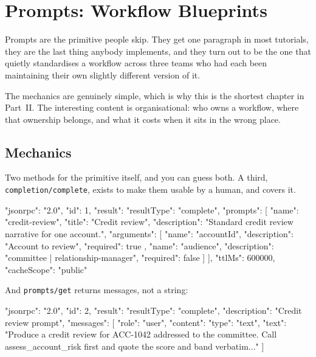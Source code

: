 \chapter{Prompts: Workflow Blueprints}
\label{ch:prompts}

Prompts are the primitive people skip. They get one paragraph in most tutorials,
they are the last thing anybody implements, and they turn out to be the one that
quietly standardises a workflow across three teams who had each been maintaining
their own slightly different version of it.

The mechanics are genuinely simple, which is why this is the shortest chapter in
Part~II. The interesting content is organisational: who owns a workflow, where
that ownership belongs, and what it costs when it sits in the wrong place.

\section{Mechanics}

Two methods for the primitive itself, and you can guess both. A third,
\texttt{completion/complete}, exists to make them usable by a human, and
 covers it.

\begin{wire}
{
  "jsonrpc": "2.0",
  "id": 1,
  "result": {
    "resultType": "complete",
    "prompts": [
      {
        "name": "credit-review",
        "title": "Credit review",
        "description": "Standard credit review narrative for one account.",
        "arguments": [
          { "name": "accountId", "description": "Account to review",
            "required": true },
          { "name": "audience", "description": "committee | relationship-manager",
            "required": false }
        ]
      }
    ],
    "ttlMs": 600000,
    "cacheScope": "public"
  }
}
\end{wire}

And \texttt{prompts/get} returns messages, not a string:

\begin{wire}
{
  "jsonrpc": "2.0",
  "id": 2,
  "result": {
    "resultType": "complete",
    "description": "Credit review prompt",
    "messages": [
      {
        "role": "user",
        "content": {
          "type": "text",
          "text": "Produce a credit review for ACC-1042 addressed to the
                   committee. Call assess_account_risk first and quote the
                   score and band verbatim..."
        }
      }
    ]
  }
}
\end{wire}

